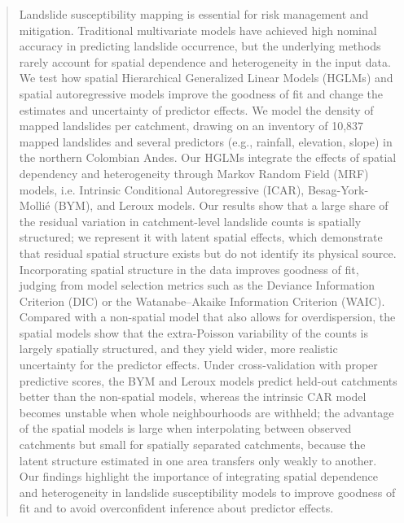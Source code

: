 \documentclass[journal abbreviation, manuscript]{copernicus}
\newcommand{\hl}[1]{#1}
\newcommand{\hlE}[1]{#1}
\begin{document}
\begin{abstract}
Landslide susceptibility mapping is essential for risk management and mitigation. 
Traditional multivariate models have achieved high nominal accuracy in predicting landslide occurrence, but the underlying methods rarely account for spatial dependence and heterogeneity in the input data. 
\hl{We test how spatial Hierarchical Generalized Linear Models (HGLMs) and spatial autoregressive models improve the goodness of fit} \hlE{and change the estimates and uncertainty of predictor effects.}
\hlE{We model the density of mapped landslides per catchment, drawing on an inventory of 10,837 mapped landslides} and several predictors (e.g., rainfall, elevation, slope) in the northern Colombian Andes. 
Our HGLMs integrate the effects of spatial dependency and heterogeneity through Markov Random Field (MRF) models, i.e. Intrinsic Conditional Autoregressive (ICAR), Besag-York-Mollié (BYM), and Leroux models. 
\hlE{Our results show that a large share of the residual variation in catchment-level landslide counts is spatially structured; we represent it with latent spatial effects, which demonstrate that residual spatial structure exists but do not identify its physical source.}
\hl{Incorporating spatial structure in the data improves goodness of fit, judging from model selection metrics such as the Deviance Information Criterion (DIC) or the Watanabe–Akaike Information Criterion (WAIC).} 
\hlE{Compared with a non-spatial model that also allows for overdispersion, the spatial models show that the extra-Poisson variability of the counts is largely spatially structured, and they yield wider, more realistic uncertainty for the predictor effects. Under cross-validation with proper predictive scores, the BYM and Leroux models predict held-out catchments better than the non-spatial models, whereas the intrinsic CAR model becomes unstable when whole neighbourhoods are withheld; the advantage of the spatial models is large when interpolating between observed catchments but small for spatially separated catchments, because the latent structure estimated in one area transfers only weakly to another.} 
\hl{Our findings highlight the importance of integrating spatial dependence and heterogeneity in landslide susceptibility models to improve goodness of fit and to avoid overconfident inference about predictor effects.}
\end{abstract}

\end{document}
